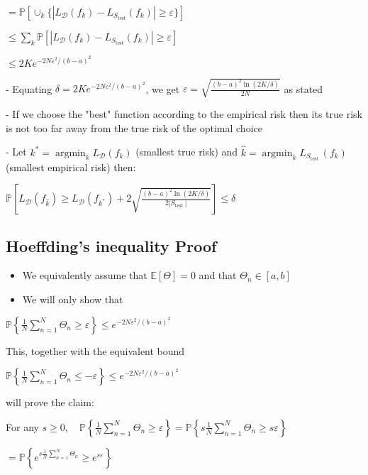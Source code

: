 $=\mathbb{P}[\cup_{k}\{ |L_{\mathscr{D}}(f_{k})-L_{S_{\text{test}}}(f_{k})|
\geq \varepsilon\}]
$

$\leq \sum_{k} \mathbb{P}[|L_{\mathscr{D}}(f_{k})-L_{S_{\text{test}}}(f_{k})| 
 \geq \varepsilon]
$

$
 \leq 2 K e^{-2 N \varepsilon^{2} /(b-a)^{2}}
$

- Equating $\delta=2 K e^{-2 N \varepsilon^{2} /(b-a)^{2}}$, we get $\varepsilon=\sqrt{\frac{(b-a)^{2} \ln (2 K / \delta)}{2 N}}$ as stated

- If we choose the "best" function according to the empirical risk then its true risk is not too far away from the true risk of the optimal choice


- Let $k^{*}=\operatorname{argmin}_{k} L_{\mathscr{D}}\left(f_{k}\right)$ (smallest true risk) and $\hat{k}=\operatorname{argmin}_{k} L_{S_{\text {test }}}\left(f_{k}\right)$ (smallest empirical risk) then:

$
\mathbb{P}\left[L_{\mathscr{D}}\left(f_{\hat{k}}\right) \geq L_{\mathscr{D}}\left(f_{k^{*}}\right)+2 \sqrt{\frac{(b-a)^{2} \ln (2 K / \delta)}{2\left|S_{\text {test }}\right|}}\right] \leq \delta
$

\subsection*{Hoeffding's inequality Proof}
\begin{itemize}
  \item We equivalently assume that $\mathbb{E}[\Theta]=0$ and that $\Theta_{n} \in[a, b]$
  \item We will only show that
\end{itemize}

$
\mathbb{P}\left\{\frac{1}{N} \sum_{n=1}^{N} \Theta_{n} \geq \varepsilon\right\} \leq e^{-2 N \varepsilon^{2} /(b-a)^{2}}
$

This, together with the equivalent bound

$
\mathbb{P}\left\{\frac{1}{N} \sum_{n=1}^{N} \Theta_{n} \leq-\varepsilon\right\} \leq e^{-2 N \varepsilon^{2} /(b-a)^{2}}
$

will prove the claim:

For any $s \geq 0, \quad \mathbb{P}\left\{\frac{1}{N} \sum_{n=1}^{N} \Theta_{n} \geq \varepsilon\right\}=\mathbb{P}\left\{s \frac{1}{N} \sum_{n=1}^{N} \Theta_{n} \geq s \varepsilon\right\}$

$
=\mathbb{P}\left\{e^{s \frac{1}{N} \sum_{n=1}^{N} \Theta_{n}} \geq e^{s \varepsilon}\right\}
$

